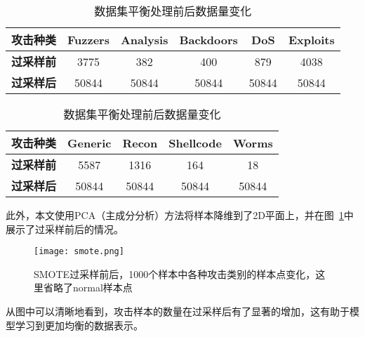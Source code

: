 \begin{table}[h]
	\centering
	\caption{数据集平衡处理前后数据量变化}
	\label{tab:attack_num_transposed_part1}
	\begin{tabular}{cccccc}
		\toprule
		攻击种类          & \textbf{Fuzzers} & \textbf{Analysis} & \textbf{Backdoors} & \textbf{DoS} & \textbf{Exploits} \\
		\midrule
		\textbf{过采样前} & 3775             & 382               & 400                & 879          & 4038              \\
		\textbf{过采样后} & 50844            & 50844             & 50844              & 50844        & 50844             \\
		\bottomrule
	\end{tabular}
	\begin{tabular}{ccccc}
		\toprule
		攻击种类          & \textbf{Generic} & \textbf{Recon} & \textbf{Shellcode} & \textbf{Worms} \\
		\midrule
		\textbf{过采样前} & 5587             & 1316           & 164                & 18             \\
		\textbf{过采样后} & 50844            & 50844          & 50844              & 50844          \\
		\bottomrule
	\end{tabular}
\end{table}
此外，本文使用PCA（主成分分析）方法将样本降维到了2D平面上，并在图~\ref{fig:prepostsmote}中展示了过采样前后的情况。
\begin{figure}[htbp]
	\centering
	\texttt{[image: smote.png]}
	\caption{SMOTE过采样前后，1000个样本中各种攻击类别的样本点变化，这里省略了normal样本点}
	\label{fig:prepostsmote}
\end{figure}
从图中可以清晰地看到，攻击样本的数量在过采样后有了显著的增加，这有助于模型学习到更加均衡的数据表示。\par

